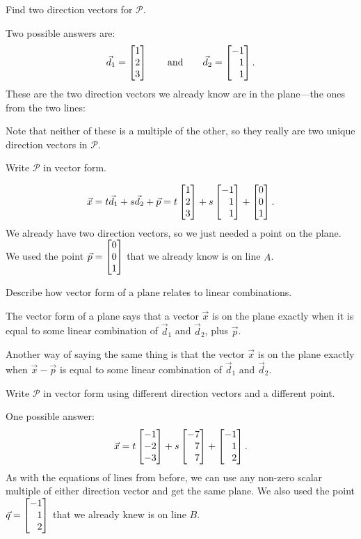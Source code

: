 \documentclass{problemset}
\begin{document}
	\begin{parts}
		\item Find two direction vectors for $\mathcal P$.
			\begin{solution}
				Two possible answers are:
				\[
					\vec d_1 = \mat{1\\2\\3}
					\qquad \text{and} \qquad
					\vec d_2 = \mat{-1\\1\\1}.
				\]
				These are the two direction vectors we already know are in the
				plane---the ones from the two lines:

				Note that neither of these is a multiple of the other, so they
				really are two unique direction vectors in $\mathcal P$.
			\end{solution}
		\item Write $\mathcal P$ in vector form.
			\begin{solution}
				\[
					\vec x = t\vec d_1 +s\vec d_2+\vec p
					= t \mat{1\\2\\3} + s \mat{-1\\1\\1} + \mat{0\\0\\1}.
				\]
				We already have two direction vectors, so we just needed a point
				on the plane. We used the point $\vec p = \mat{0\\0\\1}$
				that we already know is on line $A$.
			\end{solution}
		\item Describe how vector form of a plane relates to linear
			combinations.
			\begin{solution}
				The vector form of a plane says that a vector $\vec x$ is on the
				plane exactly when it is equal to some linear combination of
				$\vec d_1$ and $\vec d_2$, plus $\vec p$.

				Another way of saying
				the same thing is that the vector $\vec x$ is on the plane
				exactly when $\vec x - \vec p$ is equal	to some linear
				combination of $\vec d_1$ and $\vec d_2$.
			\end{solution}
		\item Write $\mathcal P$ in vector form using different
			direction vectors and a different point.
			\begin{solution}
				One possible answer:
				\[
					\vec x = t\mat{-1\\-2\\-3}+s\mat{-7\\7\\7}+\mat{-1\\1\\2}.
				\]
				As with the equations of lines from before, we can use any
				non-zero scalar multiple of either direction vector and get the
				same plane. We also used the point $\vec q = \mat{-1\\1\\2}$
				that we already knew is on line $B$.
			\end{solution}
	\end{parts}
\end{document}
